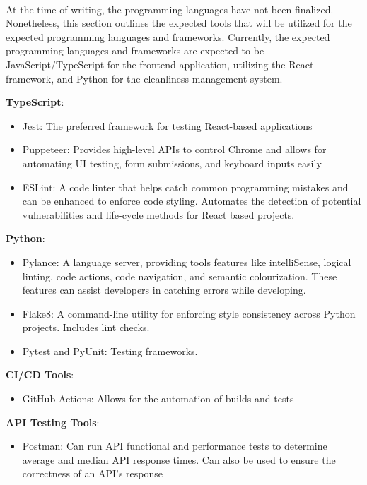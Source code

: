 \documentclass[12pt, titlepage]{article}
\begin{document}

\\ 
  At the time of writing, the programming languages have not been finalized. Nonetheless, this section outlines the expected tools that will be utilized for the expected programming languages and frameworks. Currently, the expected programming languages and frameworks are expected to be JavaScript/TypeScript for the frontend application, utilizing the React framework, and Python for the cleanliness management system.
  
  \textbf{TypeScript}:
   \begin{itemize}
   \item Jest: The preferred framework for testing React-based applications
   \item Puppeteer: Provides high-level APIs to control Chrome and allows for automating UI testing, form submissions, and keyboard inputs easily
   \item ESLint: A code linter that helps catch common programming mistakes and can be enhanced to enforce code styling. Automates the detection of potential vulnerabilities and life-cycle methods for React based projects.
   \end{itemize}
   \textbf{Python}:
   \begin{itemize}
   \item Pylance: A language server, providing tools features like intelliSense, logical linting, code actions, code navigation, and semantic colourization. These features can assist developers in catching errors while developing.
   \item Flake8: A command-line utility for enforcing style consistency across Python projects. Includes lint checks.
   \item Pytest and PyUnit: Testing frameworks.
   \end{itemize}
  \textbf{CI/CD Tools}:
  \begin{itemize}
  \item GitHub Actions: Allows for the automation of builds and tests
  \end{itemize}
    \textbf{API Testing Tools}:
  \begin{itemize}
  \item Postman: Can run API functional and performance tests to determine average and median API response times. Can also be used to ensure the correctness of an API's response 
  \end{itemize}
\end{document}
